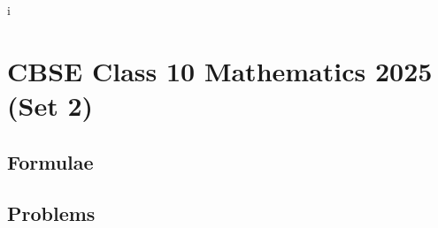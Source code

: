 \documentclass[journal]{IEEEtran}
\begin{document}
\newpage


\tableofcontents

\newpage
\onecolumn


i
\renewcommand{\thetable}{\theenumi}

\section{CBSE Class 10 Mathematics 2025 (Set 2)}
\subsection{Formulae}

\subsection{Problems}

\end{document}
